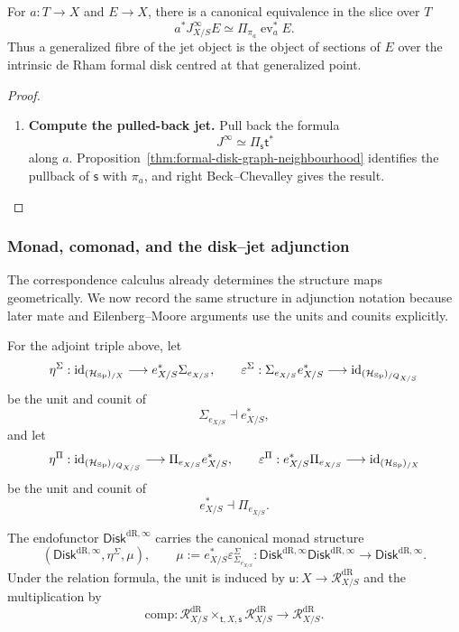 \begin{theorem}
\label{thm:fibrewise-jets}
For \(a:T\to X\) and \(E\to X\), there is a canonical equivalence in the
slice over \(T\)
\[
  a^*J^\infty_{X/S}E
  \simeq
  \Pi_{\pi_a}\operatorname{ev}_a^*E.
\]
Thus a generalized fibre of the jet object is the object of sections of \(E\)
over the intrinsic de Rham formal disk centred at that generalized point.
\end{theorem}

\begin{proof}
\leavevmode
\begin{enumerate}[label=\textup{(\arabic*)}]
    \item \textbf{Compute the pulled-back jet.}
Pull back the formula
\[
  J^\infty\simeq\Pi_{\mathsf s}\mathsf t^*
\]
along \(a\). Proposition~\ref{thm:formal-disk-graph-neighbourhood} identifies the
pullback of \(\mathsf s\) with \(\pi_a\), and right Beck--Chevalley gives the
result.
\end{enumerate}
\end{proof}

\subsubsection{Monad, comonad, and the disk--jet adjunction}

The correspondence calculus already determines the structure maps
geometrically. We now record the same structure in adjunction notation because
later mate and Eilenberg--Moore arguments use the units and counits
explicitly.

For the adjoint triple above, let
\[
  \eta^\Sigma:
  \operatorname{id}_{(\mathcal H_{\operatorname{Sp}})_{/X}}
  \longrightarrow
  e_{X/S}^*\Sigma_{e_{X/S}},
  \qquad
  \varepsilon^\Sigma:
  \Sigma_{e_{X/S}}e_{X/S}^*
  \longrightarrow
  \operatorname{id}_{(\mathcal H_{\operatorname{Sp}})_{/Q_{X/S}}}
\]
be the unit and counit of
\[
  \Sigma_{e_{X/S}}\dashv e_{X/S}^*,
\]
and let
\[
  \eta^\Pi:
  \operatorname{id}_{(\mathcal H_{\operatorname{Sp}})_{/Q_{X/S}}}
  \longrightarrow
  \Pi_{e_{X/S}}e_{X/S}^*,
  \qquad
  \varepsilon^\Pi:
  e_{X/S}^*\Pi_{e_{X/S}}
  \longrightarrow
  \operatorname{id}_{(\mathcal H_{\operatorname{Sp}})_{/X}}
\]
be the unit and counit of
\[
  e_{X/S}^*\dashv\Pi_{e_{X/S}}.
\]

\begin{proposition}
The endofunctor \(\mathsf{Disk}^{\mathrm{dR},\infty}\) carries the canonical monad structure
\[
  (\mathsf{Disk}^{\mathrm{dR},\infty},\eta^\Sigma,\mu),
  \qquad
  \mu:=e_{X/S}^*\varepsilon^\Sigma_{\Sigma_{e_{X/S}}}:
  \mathsf{Disk}^{\mathrm{dR},\infty} \mathsf{Disk}^{\mathrm{dR},\infty}\to \mathsf{Disk}^{\mathrm{dR},\infty}.
\]
Under the relation formula, the unit is induced by \(\mathsf u:X\to\mathcal R^{\mathrm{dR}}_{X/S}\) and the
multiplication by
\[
  \mathrm{comp}:\mathcal R^{\mathrm{dR}}_{X/S}\times_{\mathsf t,X,\mathsf s}\mathcal R^{\mathrm{dR}}_{X/S}\to\mathcal R^{\mathrm{dR}}_{X/S}.
\]
\end{proposition}

